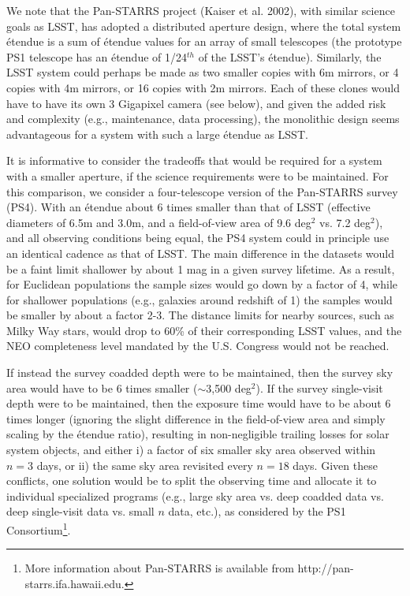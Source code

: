 \documentclass{emulateapj}
\begin{document}
We note that the Pan-STARRS project (Kaiser et al. 2002), with similar science
goals as LSST, has adopted a distributed aperture design, where the total
system \'etendue is 
a sum of \'etendue values for an array of small telescopes (the prototype
PS1 telescope has an \'etendue of 1/24$^{th}$ of the LSST's \'etendue). 
Similarly, the LSST system could perhaps be made as two smaller copies with 
6m mirrors, or 4 copies with 4m mirrors, or 16 copies with 2m mirrors. Each 
of these clones would have to have its own 3 Gigapixel camera (see below), and 
given the added risk and complexity (e.g., maintenance, data processing), the monolithic 
design seems advantageous for a system with such a large \'etendue as LSST. 

It is informative to consider the tradeoffs that would be required 
for a system with a smaller aperture, if the science requirements were
to be maintained. For this comparison, we consider a four-telescope version of
the Pan-STARRS survey (PS4). With an \'etendue about 6 times smaller 
than that of LSST (effective diameters of 6.5m and 3.0m, and a field-of-view area 
of 9.6 deg$^2$ vs. 7.2 deg$^2$), and all observing conditions being equal,
the PS4 system could in principle use an identical cadence as that of LSST. The
main difference in the datasets would be a faint limit shallower by about 
1 mag in a given survey lifetime. As a result, for Euclidean populations the 
sample sizes would go down by a factor of 4, while for shallower populations (e.g.,
galaxies around redshift of 1) the samples would be smaller by about a factor 2-3. 
The distance limits for nearby sources, such as Milky Way stars, would drop to
60\% of their corresponding LSST values, and the NEO completeness level mandated by
the U.S. Congress would not be reached.  

If instead the survey coadded depth were to be maintained, then the survey sky 
area would have to be 6 times smaller ($\sim$3,500 deg$^2$). If the
survey single-visit depth were to be maintained, then the exposure
time would have to be about 6 times longer (ignoring the slight difference
in the field-of-view area and simply scaling by the \'etendue ratio), 
resulting in non-negligible trailing losses for solar system objects, 
and either 
i) a factor of six smaller sky area observed within $n=3$ days, or 
ii) the same sky area revisited every $n=18$ days. 
Given these conflicts, one solution would be to split the observing time and 
allocate it to individual specialized programs (e.g., large sky area vs. 
deep coadded data vs. deep single-visit data vs. small $n$ data, etc.), 
as considered by the PS1 Consortium\footnote{More information about 
Pan-STARRS is available from http://pan-starrs.ifa.hawaii.edu.}. 
\end{document}
